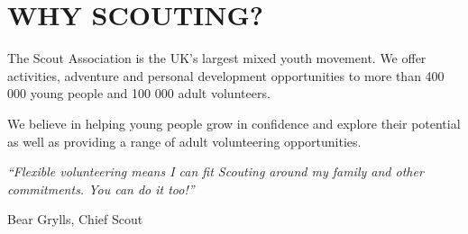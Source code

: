 \documentclass[12pt,foldmark]{leaflet}
\begin{document}
\withrotationtrue
\section{WHY SCOUTING?}
\withrotationfalse
The Scout Association is the UK's largest mixed youth movement. We offer activities, adventure and personal development opportunities to more than 400 000 young people and 100 000 adult volunteers.

We believe in helping young people grow in confidence and explore their potential as well as providing a range of adult volunteering opportunities.
\vfill
\epigraph{\textit{``Flexible volunteering means I can fit Scouting around my family and other commitments. You can do it too!''}}{Bear Grylls, Chief Scout}

\newpage




\end{document}
